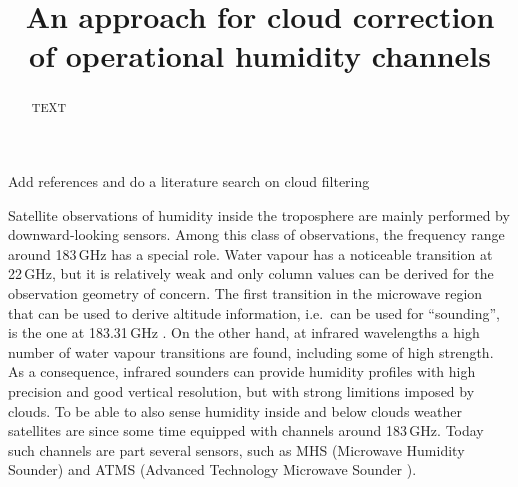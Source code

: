\documentclass[amt, manuscript]{copernicus}
\newcommand{\todo}[1]{{\color{red} #1}}
\begin{document}
\title{An approach for cloud correction of operational humidity channels}










\maketitle


\begin{abstract}
TEXT
\end{abstract}




\introduction
%
\todo{Add references and do a literature search on cloud filtering}

Satellite observations of humidity inside the troposphere are mainly performed
by downward-looking sensors. Among this class of observations, the frequency
range around 183\,GHz has a special role. Water vapour has a noticeable
transition at 22\,GHz, but it is relatively weak and only column values can be
derived \citep[e.g.][]{schluessel1990atmospheric} for the observation geometry
of concern. The first transition in the microwave region that can be used to
derive altitude information, i.e.\ can be used for ``sounding'', is the one at
183.31\,GHz \citep[e.g.][]{kakar1983retrieval}. On the other hand, at
infrared wavelengths a high number of water vapour transitions are found,
including some of high strength. As a consequence, infrared sounders can
provide humidity profiles with high precision and good vertical resolution, but
with strong limitions imposed by clouds. To be able to also sense humidity
inside and below clouds weather satellites are since some time equipped with
channels around 183\,GHz. Today such channels are part several sensors, such as
MHS (Microwave Humidity Sounder) and ATMS (Advanced Technology Microwave
Sounder ).
\end{document}
